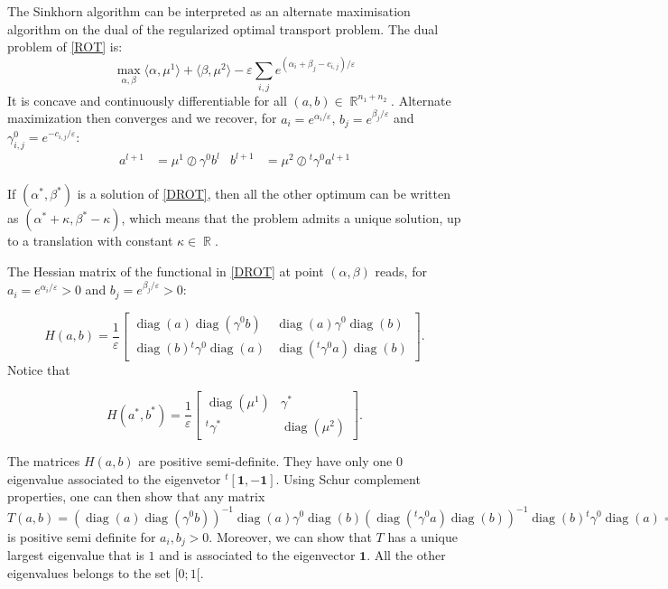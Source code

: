 \documentclass{article} %
\DeclareMathOperator{\IR}{\mathbb{R}}
\DeclareMathOperator{\diag}{diag}
\renewcommand{\epsilon}{\varepsilon}
\theoremstyle{plain}
\theoremstyle{definition}
\theoremstyle{remark}
\begin{document}
The Sinkhorn algorithm can be interpreted as an alternate maximisation algorithm on the dual of the regularized optimal transport problem.
The dual problem of \eqref{ROT} is:
\begin{equation}\label{DROT}\max_{\alpha,\beta}\langle \alpha,\mu^1\rangle+\langle \beta,\mu^2\rangle-\epsilon\sum_{i,j}e^{(\alpha_i+\beta_j-c_{i,j})/\epsilon}\end{equation}
It is concave and continuously differentiable for all $(a,b)\in\IR^{n_1+n_2}$. Alternate maximization then converges and we recover, for $a_i=e^{\alpha_i/\epsilon}$, $b_j=e^{\beta_j/\epsilon}$ and $\gamma^0_{i,j}=e^{-c_{i,j}/\epsilon}$:
\begin{align*}
a^{l+1} &= {\mu^1}\oslash{\gamma^0 b^l} &
b^{l+1} &= {\mu^2}\oslash{^t \gamma^0 a^{l+1}} 
\end{align*}

If $(\alpha^*,\beta^*)$ is a solution of \eqref{DROT}, then all the 
other optimum can be written as $(\alpha^*+\kappa,\beta^*-\kappa)$, which means that the problem admits a unique solution, up to a translation with constant $\kappa\in\IR$.


The Hessian matrix of the functional in \eqref{DROT} at point $(\alpha,\beta)$ reads, for $a_i=e^{\alpha_i/\epsilon}>0$ and $b_j=e^{\beta_j/\epsilon}>0$:


$$H(a,b)=\frac1\epsilon\begin{bmatrix}
\diag(a)\diag(\gamma^0 b)&\diag(a)\gamma^0 \diag(b)\\
\diag(b){^t\gamma^0} \diag(a)&\diag(^t\gamma^0a)\diag(b)
\end{bmatrix}.$$
Notice that 

$$H(a^*,b^*)=\frac1\epsilon\begin{bmatrix}
\diag(\mu^1)&\gamma^*\\
^t\gamma^*&\diag(\mu^2)
\end{bmatrix}.$$


The matrices $H(a,b)$  are positive semi-definite. They have only one $0$ eigenvalue associated to the eigenvetor $^t[\mathbf{1},-\mathbf{1}]$. 
Using Schur complement properties, one can then show that any matrix $T(a,b)=(\diag(a)\diag(\gamma^0 b))^{-1}\diag(a)\gamma^0\diag(b)(\diag(^t\gamma^0a)\diag(b))^{-1} \diag(b){^t\gamma^0}\diag(a)=(\diag(\gamma^0 b))^{-1}\gamma^0(\diag(^t\gamma^0a))^{-1} \diag(b){^t\gamma^0}\diag(a)$ is positive semi definite for $a_i,b_j>0$. Moreover, we can show that $T$ has a unique largest eigenvalue that is $1$ and is associated to the eigenvector $\mathbf{1}$. All the other eigenvalues belongs to the set $[0;1[$.
\end{document}
